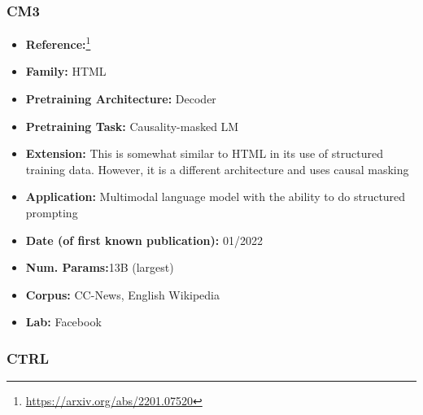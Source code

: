 \documentclass{article}
\begin{document}
\subsubsection{CM3}

            \begin{itemize}
                \item \textbf{Reference:}\footnote{\url{https://arxiv.org/abs/2201.07520}}\cite{aghajanyan2022cm3}
                \item \textbf{Family:} HTML 
                \item \textbf{Pretraining Architecture:} Decoder
                \item \textbf{Pretraining Task:} Causality-masked LM
                \item \textbf{Extension:} This is somewhat similar to HTML in its use of structured training data. However, it is a different architecture and uses causal masking  
                \item \textbf{Application:} Multimodal language model with the ability to do structured prompting
                \item \textbf{Date (of first known publication):} 01/2022
                \item \textbf{Num. Params:}13B (largest)
                \item \textbf{Corpus:} CC-News, English Wikipedia
                \item \textbf{Lab:} Facebook
            \end{itemize}

\subsubsection{CTRL}
\end{document}
